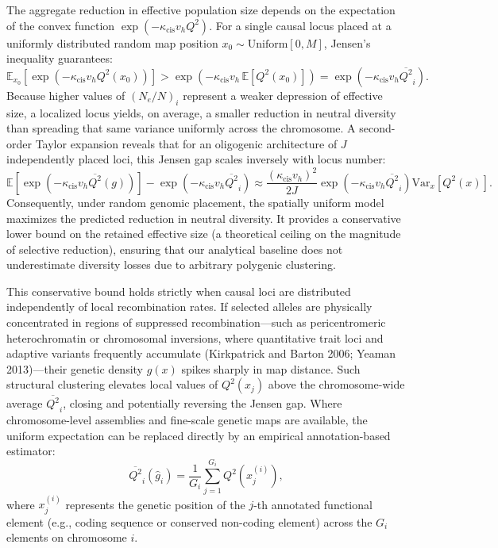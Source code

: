 \documentclass[12pt]{article}
\begin{document}
The aggregate reduction in effective population size depends on the expectation of the convex function $\exp\left(-\kappa_\text{cis} v_h Q^2\right)$. For a single causal locus placed at a uniformly distributed random map position $x_0 \sim \mathrm{Uniform}[0,M]$, Jensen's inequality guarantees:
\begin{equation}
    \mathbb{E}_{x_0}\left[\exp\left(-\kappa_\text{cis} v_h Q^2(x_0)\right)\right] > \exp\left(-\kappa_\text{cis} v_h\,\mathbb{E}[Q^2(x_0)]\right) = \exp\left(-\kappa_\text{cis} v_h \overline{Q^2}_i\right).
\end{equation}
Because higher values of $(N_e/N)_i$ represent a weaker depression of effective size, a localized locus yields, on average, a smaller reduction in neutral diversity than spreading that same variance uniformly across the chromosome. A second-order Taylor expansion reveals that for an oligogenic architecture of $J$ independently placed loci, this Jensen gap scales inversely with locus number:
\begin{equation}
    \mathbb{E}\left[\exp\left(-\kappa_\text{cis} v_h \overline{Q^2}(g)\right)\right] - \exp\left(-\kappa_\text{cis} v_h \overline{Q^2}_i\right) \approx \frac{(\kappa_\text{cis} v_h)^2}{2J}\exp\left(-\kappa_\text{cis} v_h \overline{Q^2}_i\right)\mathrm{Var}_x\left[Q^2(x)\right].
\end{equation}
Consequently, under random genomic placement, the spatially uniform model maximizes the predicted reduction in neutral diversity. It provides a conservative lower bound on the retained effective size (a theoretical ceiling on the magnitude of selective reduction), ensuring that our analytical baseline does not underestimate diversity losses due to arbitrary polygenic clustering.

This conservative bound holds strictly when causal loci are distributed independently of local recombination rates. If selected alleles are physically concentrated in regions of suppressed recombination—such as pericentromeric heterochromatin or chromosomal inversions, where quantitative trait loci and adaptive variants frequently accumulate (Kirkpatrick and Barton 2006; Yeaman 2013)—their genetic density $g(x)$ spikes sharply in map distance. Such structural clustering elevates local values of $Q^2(x_j)$ above the chromosome-wide average $\overline{Q^2}_i$, closing and potentially reversing the Jensen gap. Where chromosome-level assemblies and fine-scale genetic maps are available, the uniform expectation can be replaced directly by an empirical annotation-based estimator:
\begin{equation}
    \overline{Q^2}_i(\hat{g}_i) = \frac{1}{G_i}\sum_{j=1}^{G_i} Q^2(x_j^{(i)}),
\end{equation}
where $x_j^{(i)}$ represents the genetic position of the $j$-th annotated functional element (e.g., coding sequence or conserved non-coding element) across the $G_i$ elements on chromosome $i$.
\end{document}
